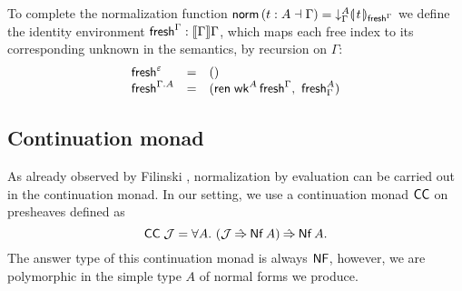 \documentclass[a4paper,USenglish,cleveref, autoref]{lipics-v2019}
\begin{document}
To complete the normalization function
$\mathsf{norm}\,(t : A \dashv \Gamma) = \mathord{\downarrow_{\Gamma}^{A}} \llparenthesis\kern0.3ext\kern0.3ex\rrparenthesis_{\mathsf{fresh}^{\Gamma}}$
we define the identity environment $\mathsf{fresh}^{\Gamma} : \mathopen{{[\kern-0.14em[}} \Gamma \mathclose{{]\kern-0.14em]}} \Gamma$,
which maps each free index to its corresponding unknown in the
semantics, by recursion on $\Gamma$:
\[
\begin{array}{lcl}
  \mathsf{fresh}^{\varepsilon} & = & () \\
  \mathsf{fresh}^{\Gamma.A} & = & (\mathsf{ren}\;\mathsf{wk}^A\,\mathsf{fresh}^{\Gamma}, \  \mathsf{fresh}^A_\Gamma)\\
\end{array}
\]

\subsection{Continuation monad}

As already observed by Filinski
\cite[Section~5.4]{filinski:semaccounttdpe}
\cite[Section~3.2]{filinski:tlca01},
normalization by evaluation can be carried out in the continuation
monad.
In our setting, we use a continuation monad $\mathsf{CC}$ on presheaves
defined as
\[
  \mathsf{CC}\;\mathcal{J} = \forall A.\ (\mathcal{J} \mathbin{\hat{\Rightarrow}} \mathsf{Nf}\,A) \mathbin{\hat{\Rightarrow}} \mathsf{Nf}\,A
  .
\]
The answer type of this continuation monad is always $\mathsf{NF}$, however,
we are polymorphic in the simple type $A$ of normal forms we produce.%
\end{document}
